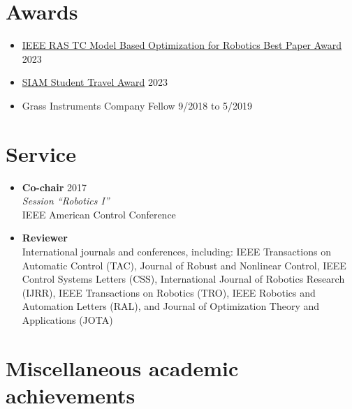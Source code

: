 \documentclass[11pt,a4paper,sans]{moderncv}
\begin{document}
\section{Awards}

\vspace{5pt}

\begin{itemize}
\item \href{https://www.tcoptrob.org/news/2024-06-12-best-paper/}{\color{cyan}IEEE RAS TC Model Based Optimization for Robotics Best Paper Award} \hfill 2023
\item  \href{https://www.siam.org/conferences/conference-support/siam-student-travel-awards}{\color{cyan}SIAM Student Travel Award} \hfill 2023
\item Grass Instruments Company Fellow \hfill 9/2018 to 5/2019
\end{itemize}

\section{Service}

\vspace{5pt}

\begin{itemize}

\item \textbf{Co-chair} \hfill 2017 \\
\textit{Session ``Robotics I''} \\
IEEE American Control Conference

\item \textbf{Reviewer} \\
International journals and conferences, including:
IEEE Transactions on Automatic Control (TAC),
Journal of Robust and Nonlinear Control,
IEEE Control Systems Letters (CSS),
International Journal of Robotics Research (IJRR),
IEEE Transactions on Robotics (TRO),
IEEE Robotics and Automation Letters (RAL), and
Journal of Optimization Theory and Applications (JOTA)

\end{itemize}

\section{Miscellaneous academic achievements}

\vspace{5pt}
\end{document}
